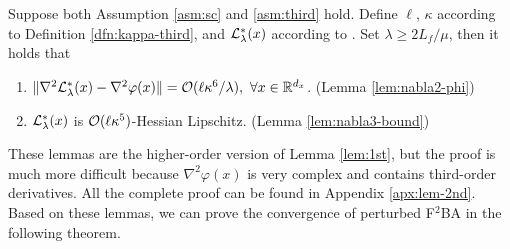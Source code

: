 \documentclass[twoside,11pt]{article}
\begin{document}
\begin{lem} \label{lem:2rd}
Suppose both Assumption \ref{asm:sc} and \ref{asm:third} hold. Define $\ell$,  $\kappa$ according to Definition \ref{dfn:kappa-third}, and ${\mathcal{L}}_{\lambda}^*(x)$ according to . Set $\lambda \ge 2L_f /\mu $, then it holds that 
\begin{enumerate}[label=\alph*.]
    \item $\Vert \nabla^2 {\mathcal{L}}_{\lambda}^*(x) - \nabla^2 \varphi(x) \Vert = {\mathcal{O}}(\ell \kappa^6 /\lambda),~\forall x \in {\mathbb{R}}^{d_x}$. {\rm (Lemma \ref{lem:nabla2-phi})}
    \item ${\mathcal{L}}_{\lambda}^*(x) $ is ${\mathcal{O}}(\ell \kappa^5)$-Hessian Lipschitz. {\rm (Lemma \ref{lem:nabla3-bound})}
\end{enumerate}
\end{lem}
These lemmas are the higher-order version of Lemma \ref{lem:1st}, but the proof is much more difficult because $\nabla^2 \varphi(x)$ is very complex and contains third-order derivatives. All the complete proof can be found in Appendix \ref{apx:lem-2nd}.
Based on these lemmas, we can prove the convergence of perturbed F${}^2$BA in the following theorem. 

\end{document}
